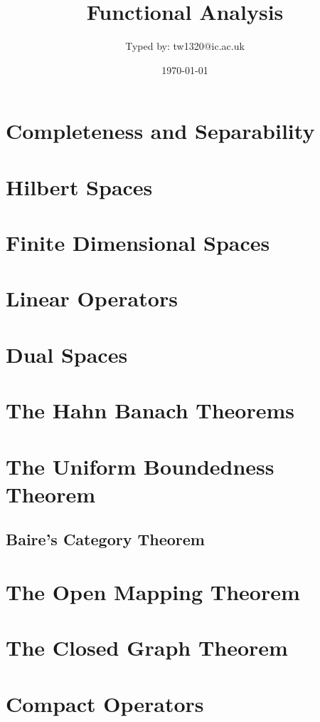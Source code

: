 \documentclass{article}
\title{Functional Analysis}
\author{Typed by: tw1320@ic.ac.uk}
\date{\today}
\begin{document}
\maketitle



\section{Completeness and Separability}  

\section{Hilbert Spaces}  

\section{Finite Dimensional Spaces}  

\section{Linear Operators}  

\section{Dual Spaces}  

\section{The Hahn Banach Theorems}  

\section{The Uniform Boundedness Theorem}
\subsection{Baire's Category Theorem}
\section{The Open Mapping Theorem}  

\section{The Closed Graph Theorem}  

\section{Compact Operators}
\end{document}
